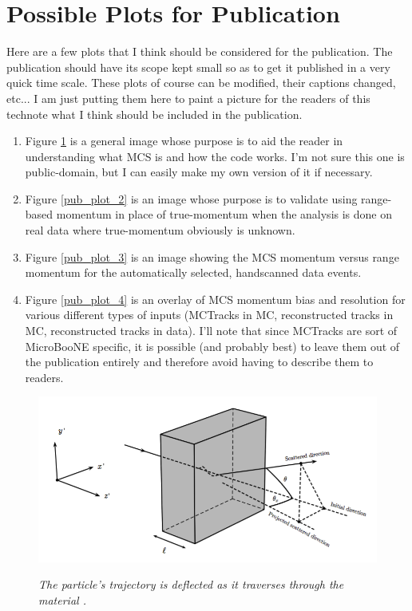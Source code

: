 \section{Possible Plots for Publication}\label{publicplots_section}
Here are a few plots that I think should be considered for the publication. The publication should have its scope kept small so as to get it published in a very quick time scale. These plots of course can be modified, their captions changed, etc... I am just putting them here to paint a picture for the readers of this technote what I think should be included in the publication.
\begin{enumerate}
	\item Figure \ref{pub_plot_1} is a general image whose purpose is to aid the reader in understanding what MCS is and how the code works. I'm not sure this one is public-domain, but I can easily make my own version of it if necessary.
	\item Figure \ref{pub_plot_2} is an image whose purpose is to validate using range-based momentum in place of true-momentum when the analysis is done on real data where true-momentum obviously is unknown.
	\item Figure \ref{pub_plot_3} is an image showing the MCS momentum versus range momentum for the automatically selected, handscanned data events.
	\item Figure \ref{pub_plot_4} is an overlay of MCS momentum bias and resolution for various different types of inputs ({\sc MCTracks} in MC, reconstructed tracks in MC, reconstructed tracks in data). I'll note that since {\sc MCTracks} are sort of MicroBooNE specific, it is possible (and probably best) to leave them out of the publication entirely and therefore avoid having to describe them to readers.
\end{enumerate}

\begin{figure}[ht!]
\centering
	\includegraphics[width=0.5\linewidth]{Figures/mcs_nocap.png} \\
\caption{\textit{The particle's trajectory is deflected as it traverses through the material \cite{leonidas1}.}}\label{pub_plot_1}
\end{figure}

